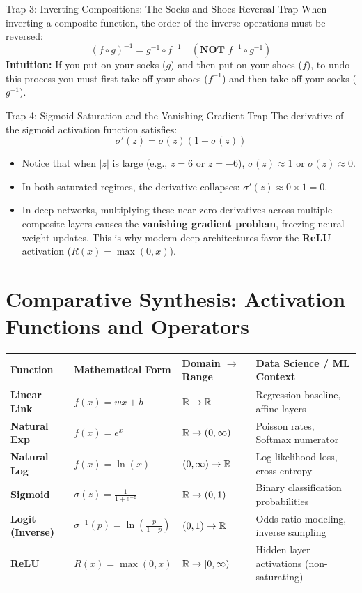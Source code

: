 \begin{trapbox}{Trap 3: Inverting Compositions: The Socks-and-Shoes Reversal Trap}
When inverting a composite function, the order of the inverse operations must be reversed:
$$(f \circ g)^{-1} = g^{-1} \circ f^{-1} \quad \left(\textbf{NOT } f^{-1} \circ g^{-1}\right)$$
\textbf{Intuition:} If you put on your socks ($g$) and then put on your shoes ($f$), to undo this process you must first take off your shoes ($f^{-1}$) and then take off your socks ($g^{-1}$).
\end{trapbox}

\begin{trapbox}{Trap 4: Sigmoid Saturation and the Vanishing Gradient Trap}
The derivative of the sigmoid activation function satisfies:
$$\sigma'(z) = \sigma(z)(1 - \sigma(z))$$
\begin{itemize}
    \item Notice that when $|z|$ is large (e.g., $z = 6$ or $z = -6$), $\sigma(z) \approx 1$ or $\sigma(z) \approx 0$.
    \item In both saturated regimes, the derivative collapses: $\sigma'(z) \approx 0 \times 1 = 0$.
    \item In deep networks, multiplying these near-zero derivatives across multiple composite layers causes the \textbf{vanishing gradient problem}, freezing neural weight updates. This is why modern deep architectures favor the \textbf{ReLU} activation ($R(x) = \max(0, x)$).
\end{itemize}
\end{trapbox}

\section{Comparative Synthesis: Activation Functions and Operators}

\begin{center}
\renewcommand{\arraystretch}{1.3}
\begin{tabular}{p{2.8cm}p{3.5cm}p{3.2cm}p{4.2cm}}
\toprule
\textbf{Function} & \textbf{Mathematical Form} & \textbf{Domain $\to$ Range} & \textbf{Data Science / ML Context} \\
\midrule
\textbf{Linear Link} & $f(x) = wx + b$ & $\mathbb{R} \to \mathbb{R}$ & Regression baseline, affine layers \\
\textbf{Natural Exp} & $f(x) = e^x$ & $\mathbb{R} \to (0, \infty)$ & Poisson rates, Softmax numerator \\
\textbf{Natural Log} & $f(x) = \ln(x)$ & $(0, \infty) \to \mathbb{R}$ & Log-likelihood loss, cross-entropy \\
\textbf{Sigmoid} & $\sigma(z) = \frac{1}{1 + e^{-z}}$ & $\mathbb{R} \to (0, 1)$ & Binary classification probabilities \\
\textbf{Logit (Inverse)} & $\sigma^{-1}(p) = \ln\left(\frac{p}{1 - p}\right)$ & $(0, 1) \to \mathbb{R}$ & Odds-ratio modeling, inverse sampling \\
\textbf{ReLU} & $R(x) = \max(0, x)$ & $\mathbb{R} \to [0, \infty)$ & Hidden layer activations (non-saturating) \\
\bottomrule
\end{tabular}
\end{center}


